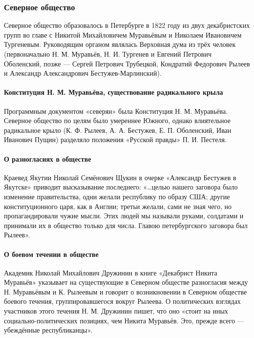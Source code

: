 \documentclass{article}
\begin{document}
\subsubsection{Северное общество}

Северное общество образовалось в Петербурге в 1822 году из двух декабристских групп во главе с Никитой Михайловичем Муравьёвым и Николаем Ивановичем Тургеневым. Руководящим органом являлась Верховная дума из трёх человек (первоначально Н. М. Муравьёв, Н. И. Тургенев и Евгений Петрович Оболенский, позже — Сергей Петрович Трубецкой, Кондратий Федорович Рылеев и Александр Александрович Бестужев-Марлинский).

\paragraph{Конституция Н. М. Муравьёва, существование радикального крыла}

Программным документом «северян» была Конституция Н. М. Муравьёва. Северное общество по целям было умереннее Южного, однако влиятельное радикальное крыло (К. Ф. Рылеев, А. А. Бестужев, Е. П. Оболенский, Иван Иванович Пущин) разделяло положения «Русской правды» П. И. Пестеля.

\paragraph{О разногласиях в обществе}

Краевед Якутии Николай Семёнович Щукин в очерке «Александр Бестужев в Якутске» приводит высказывание последнего: «…целью нашего заговора было изменение правительства, одни желали республику по образу США; другие конституционного царя, как в Англии; третьи желали, сами не зная чего, но пропагандировали чужие мысли. Этих людей мы называли руками, солдатами и принимали их в общество только для числа. Главою петербургского заговора был Рылеев».

\paragraph{О боевом течении в обществе}

Академик Николай Михайлович Дружинин в книге «Декабрист Никита Муравьёв» указывает на существующие в Северном обществе разногласия между Н. Муравьёвым и К. Рылеевым и говорит о возникновении в Северном обществе боевого течения, группировавшегося вокруг Рылеева. О политических взглядах участников этого течения Н. М. Дружинин пишет, что оно «стоит на иных социально-политических позициях, чем Никита Муравьёв. Это, прежде всего — убеждённые республиканцы». 
\end{document}
